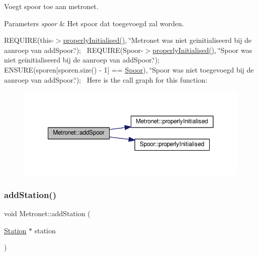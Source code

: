 Voegt spoor toe aan metronet. 


\begin{DoxyParams}{Parameters}
{\em spoor} & Het spoor dat toegevoegd zal worden.\\
\hline
\end{DoxyParams}
R\+E\+Q\+U\+I\+RE(this-\/$>$\hyperlink{class_metronet_a3d2adce29a947f162924279b766de645}{properly\+Initialised()}, \char`\"{}\+Metronet was niet geinitialiseerd bij de aanroep van add\+Spoor.\char`\"{});~\newline
R\+E\+Q\+U\+I\+RE(Spoor-\/$>$\hyperlink{class_metronet_a3d2adce29a947f162924279b766de645}{properly\+Initialised()}, \char`\"{}\+Spoor was niet geinitialiseerd bij de aanroep van add\+Spoor.\char`\"{});~\newline
E\+N\+S\+U\+RE(sporen\mbox{[}sporen.\+size() -\/ 1\mbox{]} == \hyperlink{class_spoor}{Spoor}), \char`\"{}\+Spoor was niet toegevoegd bij de aanroep van add\+Spoor.\char`\"{});~\newline
Here is the call graph for this function\+:\nopagebreak
\begin{figure}[H]
\begin{center}
\leavevmode
\includegraphics[width=350pt]{class_metronet_a499d8ac62450fec83bc10101de53cd76_cgraph}
\end{center}
\end{figure}
\mbox{\label{class_metronet_ac7f4069e577cd4dddb1e166923df3ecb}} 
\subsubsection{\texorpdfstring{add\+Station()}{addStation()}}
{\footnotesize\ttfamily void Metronet\+::add\+Station (\begin{DoxyParamCaption}\item[{\hyperlink{class_station}{Station} $\ast$}]{station }\end{DoxyParamCaption})}



